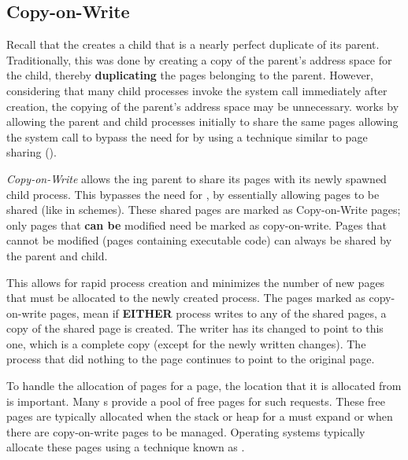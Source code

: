 \subsection{Copy-on-Write}\label{subsec:Memory_Copy_on_Write}
Recall that the   creates a child  that is a nearly perfect duplicate of its parent.
Traditionally, this was done by creating a copy of the parent’s address space for the child, thereby \textbf{duplicating} the pages belonging to the parent.
However, considering that many child processes invoke the  system call immediately after creation, the copying of the parent’s address space may be unnecessary.
 works by allowing the parent and child processes initially to share the same pages allowing the  system call to bypass the need for  by using a technique similar to page sharing ().

\begin{definition}\label{def:Memory_Copy_on_Write}
  \emph{Copy-on-Write} allows the ing parent  to share its pages with its newly spawned child process.
  This bypasses the need for , by essentially allowing pages to be shared (like in  schemes).
  These shared pages are marked as Copy-on-Write pages; only pages that \textbf{can be} modified need be marked as copy-on-write.
  Pages that cannot be modified (pages containing executable code) can always be shared by the parent and child.

  This allows for rapid process creation and minimizes the number of new pages that must be allocated to the newly created process.
  The pages marked as copy-on-write pages, mean if \textbf{EITHER} process writes to any of the shared pages, a copy of the shared page is created.
  The writer has its  changed to point to this one, which is a complete copy (except for the newly written changes).
  The process that did nothing to the page continues to point to the original page.
\end{definition}

To handle the allocation of pages for a  page, the location that it is allocated from is important.
Many s provide a pool of free pages for such requests.
These free pages are typically allocated when the stack or heap for a  must expand or when there are copy-on-write pages to be managed.
Operating systems typically allocate these pages using a technique known as .

